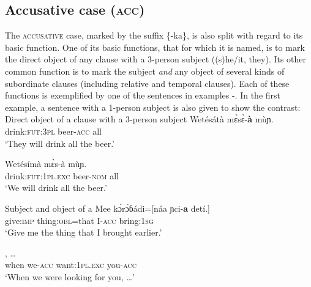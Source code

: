   \z
\z







\subsection{Accusative case (\textsc{acc})}\label{sec:7.3}


The \textsc{accusative} case, marked by the suffix \{-ka\}, is also split with regard to its basic function. One of its basic functions, that for which it is named, is to mark the direct object of any clause with a 3-person subject ((s)he/it, they). Its other common function is to mark the subject \textit{and} any object of several kinds of subordinate clauses (including relative and temporal clauses). Each of these functions is exemplified by one of the sentences in examples -. In the first example, a sentence with a 1-person subject is also given to show the contrast:\\




Direct object of a clause with a 3-person subject
\ea\label{ex:case:12}
\gll Wetésátà   m\`{ɛ}s\`{ɛ}-\textbf{à}   mùɲ. \\
drink:\textsc{fut:3pl}   beer-\textsc{acc}   all    \\
\glt ‘They will drink all the beer.’ 
\z




\ea\label{ex:case:13}
\gll Wetésímà     m\`{ɛ}s-à     mùɲ. \\
drink:\textsc{fut:1pl.exc}   beer-\textsc{nom}   all    \\
\glt ‘We will drink all the beer.’ 
\z





Subject and object of a 
\ea\label{ex:case:14}
\gll Mee   k\'{ɔ}r\'{ɔ}ɓ\'{a}di=[náa   ɲci-\textbf{a}   detí.]   \\
give:\textsc{imp}   thing:\textsc{obl}=that\textsc{}  I-\textsc{acc}   bring:\textsc{1sg}   \\   
\glt ‘Give me the thing that I brought earlier.’ 
\z




\ea\label{ex:case:15}
, {\dots} \\
when   we-\textsc{acc}   want:\textsc{1pl.exc}   you-\textsc{acc}    \\
\glt ‘When we were looking for you, {\dots}’ 
\z






